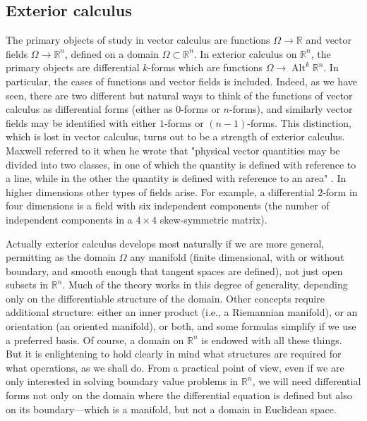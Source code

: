\subsection{{Exterior calculus}}\label{sec:exterior-calculus}

{The primary objects of study in vector calculus are functions $\Omega\to\mathbb R$ and vector fields $\Omega\to\mathbb R^n$, defined on a domain $\Omega\subset\mathbb R^n$. In exterior calculus on $\mathbb R^n$, the primary objects are differential $k$-forms which are functions $\Omega\to\operatorname{Alt}^k\mathbb R^n$. In particular, the cases of functions and vector fields is included. Indeed, as we have seen, there are two different but natural ways to think of the functions of vector calculus as differential forms (either as $0$-forms or $n$-forms), and similarly vector fields may be identified with either $1$-forms or $(n-1)$-forms. This distinction, which is lost in vector calculus, turns out to be a strength of exterior calculus. Maxwell referred to it when he wrote that "physical vector quantities may be divided into two classes, in one of which the quantity is defined with reference to a line, while in the other the quantity is defined with reference to an area" . In higher dimensions other types of fields arise. For example, a differential $2$-form in four dimensions is a field with six independent components (the number of independent components in a $4\times4$ skew-symmetric matrix).}

{Actually exterior calculus develops most naturally if we are more general, permitting as the domain $\Omega$ any manifold (finite dimensional, with or without boundary, and smooth enough that tangent spaces are defined), not just open subsets in $\mathbb R^n$. Much of the theory works in this degree of generality, depending only on the differentiable structure of the domain. Other concepts require additional structure: either an inner product (i.e., a Riemannian manifold), or an orientation (an oriented manifold), or both, and some formulas simplify if we use a preferred basis. Of course, a domain on $\mathbb R^n$ is endowed with all these things. But it is enlightening to hold clearly in mind what structures are required for what operations, as we shall do. From a practical point of view, even if we are only interested in solving boundary value problems in $\mathbb R^n$, we will need differential forms not only on the domain where the differential equation is defined but also on its boundary---which is a manifold, but not a domain in Euclidean space.}

